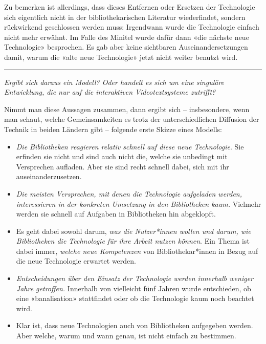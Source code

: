 \documentclass[a4paper,
fontsize=11pt,
oneside,
numbers=noperiodatend,
parskip=half-,
bibliography=totoc,
final
]{scrartcl}
\begin{document}
Zu bemerken ist allerdings, dass dieses Entfernen oder Ersetzen der
Technologie sich eigentlich nicht in der bibliothekarischen Literatur
wiederfindet, sondern rückwirkend geschlossen werden muss: Irgendwann
wurde die Technologie einfach nicht mehr erwähnt. Im Falle des Minitel
wurde dafür dann «die nächste neue Technologie» besprochen. Es gab aber
keine sichtbaren Auseinandersetzungen damit, warum die «alte neue
Technologie» jetzt nicht weiter benutzt wird.

\begin{center}\rule{0.5\linewidth}{0.5pt}\end{center}

\emph{Ergibt sich daraus ein Modell? Oder handelt es sich um eine
singuläre Entwicklung, die nur auf die interaktiven Videotextsysteme
zutrifft?}

Nimmt man diese Aussagen zusammen, dann ergibt sich -- insbesondere,
wenn man schaut, welche Gemeinsamkeiten es trotz der unterschiedlichen
Diffusion der Technik in beiden Ländern gibt -- folgende erste Skizze
eines Modells:

\begin{itemize}
\item
  \emph{Die Bibliotheken reagieren relativ schnell auf diese neue
  Technologie}. Sie erfinden sie nicht und sind auch nicht die, welche
  sie unbedingt mit Versprechen aufladen. Aber sie sind recht schnell
  dabei, sich mit ihr auseinanderzusetzen.
\item
  \emph{Die meisten Versprechen, mit denen die Technologie aufgeladen
  werden, interessieren in der konkreten Umsetzung in den Bibliotheken
  kaum.} Vielmehr werden sie schnell auf Aufgaben in Bibliotheken hin
  abgeklopft.
\item
  Es geht dabei sowohl darum, \emph{was die Nutzer*innen wollen und
  darum, wie Bibliotheken die Technologie für ihre Arbeit nutzen
  können}. Ein Thema ist dabei immer, \emph{welche neue Kompetenzen} von
  Bibliothekar*innen in Bezug auf die neue Technologie erwartet werden.
\item
  \emph{Entscheidungen über den Einsatz der Technologie werden innerhalb
  weniger Jahre getroffen.} Innerhalb von vielleicht fünf Jahren wurde
  entschieden, ob eine «banalisation» stattfindet oder ob die
  Technologie kaum noch beachtet wird.
\item
  Klar ist, dass neue Technologien auch von Bibliotheken aufgegeben
  werden. Aber welche, warum und wann genau, ist nicht einfach zu
  bestimmen.
\end{itemize}
\end{document}

